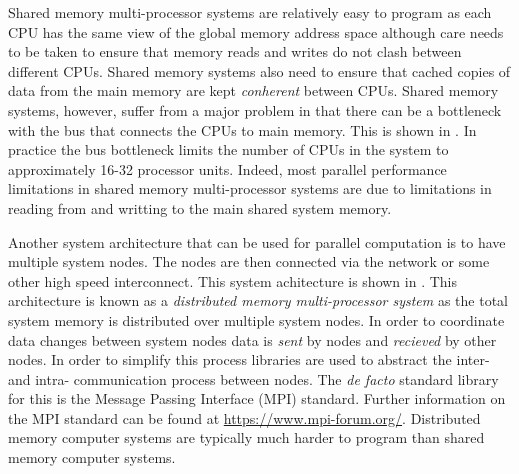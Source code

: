 
Shared memory multi-processor systems are relatively easy to program
as each CPU has the same view of the global memory address space
although care needs to be taken to ensure that memory reads and writes
do not clash between different CPUs. Shared memory systems also need
to ensure that cached copies of data from the main memory are
kept \emph{conherent} between CPUs. Shared memory systems, however,
suffer from a major problem in that there can be a bottleneck with the
bus that connects the CPUs to main memory. This is shown
in . In practice the bus
bottleneck limits the number of CPUs in the system to approximately
16-32 processor units. Indeed, most parallel performance limitations
in shared memory multi-processor systems are due to limitations in
reading from and writting to the main shared system memory.


Another system architecture that can be used for parallel computation
is to have multiple system nodes. The nodes are then connected via the
network or some other high speed interconnect. This system achitecture
is shown in . This architecture
is known as a \emph{distributed memory multi-processor system} as the
total system memory is distributed over multiple system nodes. In
order to coordinate data changes between system nodes data
is \emph{sent} by nodes and \emph{recieved} by other nodes. In order
to simplify this process libraries are used to abstract the inter- and
intra- communication process between nodes. The \emph{de facto}
standard library for this is the Message Passing Interface (MPI)
standard. Further information on the MPI standard can be found
at \url{https://www.mpi-forum.org/}. Distributed memory computer
systems are typically much harder to program than shared memory
computer systems.


